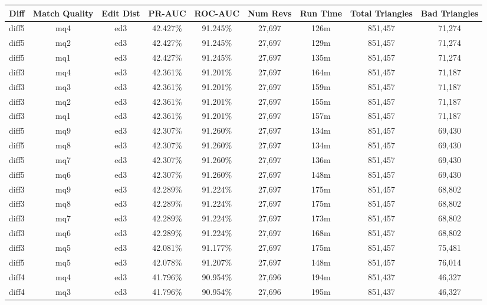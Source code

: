 \begin{sidewaystable}[!ph]
  \begin{center}
    \begin{tabular}{|c|c|c||c|c||c|c|c|c|}
\hline
Diff & Match Quality & Edit Dist
        & PR-AUC & ROC-AUC
        & Num Revs & Run Time
        & Total Triangles & Bad Triangles \\
\hline
\hline
diff5 & mq4 & ed3 & 42.427\% & 91.245\% & 27,697 & 126m & 851,457 & 71,274 \\
diff5 & mq2 & ed3 & 42.427\% & 91.245\% & 27,697 & 129m & 851,457 & 71,274 \\
diff5 & mq1 & ed3 & 42.427\% & 91.245\% & 27,697 & 135m & 851,457 & 71,274 \\
diff3 & mq4 & ed3 & 42.361\% & 91.201\% & 27,697 & 164m & 851,457 & 71,187 \\
diff3 & mq3 & ed3 & 42.361\% & 91.201\% & 27,697 & 159m & 851,457 & 71,187 \\
diff3 & mq2 & ed3 & 42.361\% & 91.201\% & 27,697 & 155m & 851,457 & 71,187 \\
diff3 & mq1 & ed3 & 42.361\% & 91.201\% & 27,697 & 157m & 851,457 & 71,187 \\
diff5 & mq9 & ed3 & 42.307\% & 91.260\% & 27,697 & 134m & 851,457 & 69,430 \\
diff5 & mq8 & ed3 & 42.307\% & 91.260\% & 27,697 & 134m & 851,457 & 69,430 \\
diff5 & mq7 & ed3 & 42.307\% & 91.260\% & 27,697 & 136m & 851,457 & 69,430 \\
diff5 & mq6 & ed3 & 42.307\% & 91.260\% & 27,697 & 148m & 851,457 & 69,430 \\
diff3 & mq9 & ed3 & 42.289\% & 91.224\% & 27,697 & 175m & 851,457 & 68,802 \\
diff3 & mq8 & ed3 & 42.289\% & 91.224\% & 27,697 & 175m & 851,457 & 68,802 \\
diff3 & mq7 & ed3 & 42.289\% & 91.224\% & 27,697 & 173m & 851,457 & 68,802 \\
diff3 & mq6 & ed3 & 42.289\% & 91.224\% & 27,697 & 168m & 851,457 & 68,802 \\
diff3 & mq5 & ed3 & 42.081\% & 91.177\% & 27,697 & 175m & 851,457 & 75,481 \\
diff5 & mq5 & ed3 & 42.078\% & 91.207\% & 27,697 & 148m & 851,457 & 76,014 \\
diff4 & mq4 & ed3 & 41.796\% & 90.954\% & 27,696 & 194m & 851,437 & 46,327 \\
diff4 & mq3 & ed3 & 41.796\% & 90.954\% & 27,696 & 195m & 851,437 & 46,327 \\

\end{tabular}
\end{center}
\end{sidewaystable}
